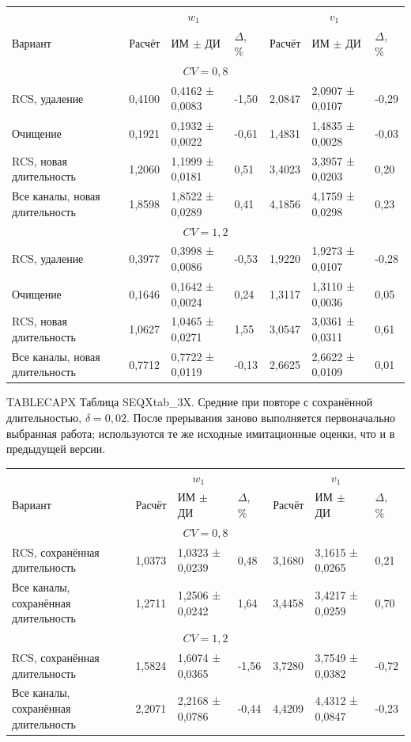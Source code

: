 \setlength{\tabcolsep}{2pt}
\begin{tabular}{p{4.16cm}p{1.61cm}p{2.83cm}p{1.28cm}p{1.61cm}p{2.83cm}p{1.28cm}}
\toprule
 & \multicolumn{3}{c}{$w_1$} & \multicolumn{3}{c}{$v_1$} \\
Вариант & Расчёт & ИМ $\pm$ ДИ & $\Delta$, \% & Расчёт & ИМ $\pm$ ДИ & $\Delta$, \% \\
\midrule
\multicolumn{7}{c}{$CV=0,8$} \\
RCS, удаление & 0,4100 & 0,4162 ± 0,0083 & -1,50 & 2,0847 & 2,0907 ± 0,0107 & -0,29 \\
Очищение & 0,1921 & 0,1932 ± 0,0022 & -0,61 & 1,4831 & 1,4835 ± 0,0028 & -0,03 \\
RCS, новая длительность & 1,2060 & 1,1999 ± 0,0181 & 0,51 & 3,4023 & 3,3957 ± 0,0203 & 0,20 \\
Все каналы, новая длительность & 1,8598 & 1,8522 ± 0,0289 & 0,41 & 4,1856 & 4,1759 ± 0,0298 & 0,23 \\
\multicolumn{7}{c}{$CV=1,2$} \\
RCS, удаление & 0,3977 & 0,3998 ± 0,0086 & -0,53 & 1,9220 & 1,9273 ± 0,0107 & -0,28 \\
Очищение & 0,1646 & 0,1642 ± 0,0024 & 0,24 & 1,3117 & 1,3110 ± 0,0036 & 0,05 \\
RCS, новая длительность & 1,0627 & 1,0465 ± 0,0271 & 1,55 & 3,0547 & 3,0361 ± 0,0311 & 0,61 \\
Все каналы, новая длительность & 0,7712 & 0,7722 ± 0,0119 & -0,13 & 2,6625 & 2,6622 ± 0,0109 & 0,01 \\
\bottomrule
\end{tabular}




\noindent TABLECAPX Таблица SEQXtab_3X. Средние при повторе с сохранённой длительностью, $\delta=0{,}02$. После прерывания заново выполняется первоначально выбранная работа; используются те же исходные имитационные оценки, что и в предыдущей версии.\par

\setlength{\tabcolsep}{2pt}
\begin{tabular}{p{4.16cm}p{1.61cm}p{2.83cm}p{1.28cm}p{1.61cm}p{2.83cm}p{1.28cm}}
\toprule
 & \multicolumn{3}{c}{$w_1$} & \multicolumn{3}{c}{$v_1$} \\
Вариант & Расчёт & ИМ $\pm$ ДИ & $\Delta$, \% & Расчёт & ИМ $\pm$ ДИ & $\Delta$, \% \\
\midrule
\multicolumn{7}{c}{$CV=0,8$} \\
RCS, сохранённая длительность & 1,0373 & 1,0323 ± 0,0239 & 0,48 & 3,1680 & 3,1615 ± 0,0265 & 0,21 \\
Все каналы, сохранённая длительность & 1,2711 & 1,2506 ± 0,0242 & 1,64 & 3,4458 & 3,4217 ± 0,0259 & 0,70 \\
\multicolumn{7}{c}{$CV=1,2$} \\
RCS, сохранённая длительность & 1,5824 & 1,6074 ± 0,0365 & -1,56 & 3,7280 & 3,7549 ± 0,0382 & -0,72 \\
Все каналы, сохранённая длительность & 2,2071 & 2,2168 ± 0,0786 & -0,44 & 4,4209 & 4,4312 ± 0,0847 & -0,23 \\
\bottomrule
\end{tabular}




